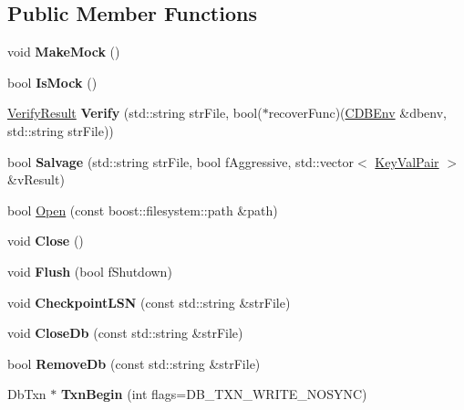 \subsection*{Public Member Functions}
\begin{DoxyCompactItemize}
\item 
\mbox{\label{class_c_d_b_env_ab352b9f28a8329037fd942f9912797e3}} 
void {\bfseries Make\+Mock} ()
\item 
\mbox{\label{class_c_d_b_env_ae44129114301a41635c3707c6bc92ab1}} 
bool {\bfseries Is\+Mock} ()
\item 
\mbox{\label{class_c_d_b_env_a9d04604da4ad6f063e150b34d5df392d}} 
\mbox{\hyperlink{class_c_d_b_env_a6fbf26da5d7f8f64a77a3ba15e4df244}{Verify\+Result}} {\bfseries Verify} (std\+::string str\+File, bool($\ast$recover\+Func)(\mbox{\hyperlink{class_c_d_b_env}{C\+D\+B\+Env}} \&dbenv, std\+::string str\+File))
\item 
\mbox{\label{class_c_d_b_env_a08726637bff0809ab9c7c493383a3914}} 
bool {\bfseries Salvage} (std\+::string str\+File, bool f\+Aggressive, std\+::vector$<$ \mbox{\hyperlink{class_c_d_b_env_a53fd285f09c312973caa6f90b33937f5}{Key\+Val\+Pair}} $>$ \&v\+Result)
\item 
bool \mbox{\hyperlink{class_c_d_b_env_aaaef61cd032e25144c06e405fb7f93cf}{Open}} (const boost\+::filesystem\+::path \&path)
\item 
\mbox{\label{class_c_d_b_env_a0bf3b64c05bf0d7f0a7dbaa9a072c0bc}} 
void {\bfseries Close} ()
\item 
\mbox{\label{class_c_d_b_env_a09c5850b88919553a8db416ce288ff1a}} 
void {\bfseries Flush} (bool f\+Shutdown)
\item 
\mbox{\label{class_c_d_b_env_aa4e0fe52dfc0da22fe9bf59eeda57fba}} 
void {\bfseries Checkpoint\+L\+SN} (const std\+::string \&str\+File)
\item 
\mbox{\label{class_c_d_b_env_ac53fd53afdd1e0881b8ffbb11a89b556}} 
void {\bfseries Close\+Db} (const std\+::string \&str\+File)
\item 
\mbox{\label{class_c_d_b_env_a1a53f94daf3096e047d7b041e6a885d6}} 
bool {\bfseries Remove\+Db} (const std\+::string \&str\+File)
\item 
\mbox{\label{class_c_d_b_env_a5f1daab338b2098ea693efad6edefb9b}} 
Db\+Txn $\ast$ {\bfseries Txn\+Begin} (int flags=D\+B\+\_\+\+T\+X\+N\+\_\+\+W\+R\+I\+T\+E\+\_\+\+N\+O\+S\+Y\+NC)
\end{DoxyCompactItemize}
